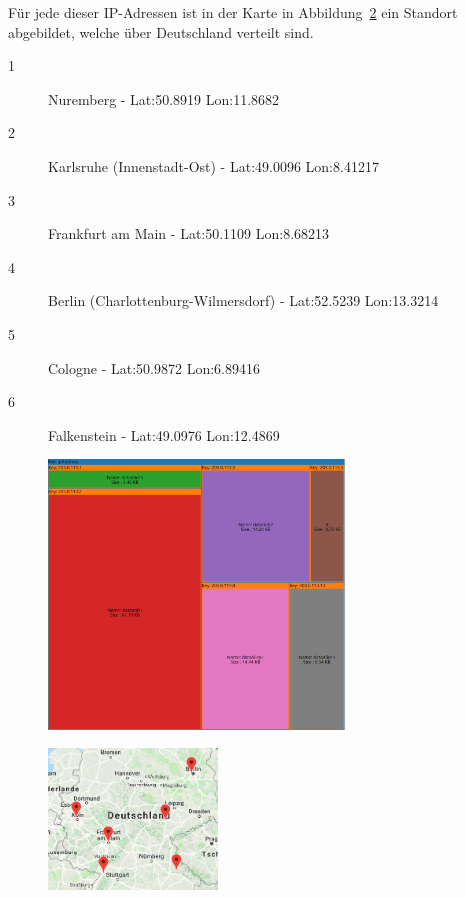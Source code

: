 \documentclass[
    fontsize=12pt,
    headings=small,
    parskip=half,           %
    bibliography=totoc,
    numbers=noenddot,       %
    open=any,               %
    ]{scrreprt}
\begin{document}
Für jede dieser IP-Adressen ist in der Karte in Abbildung~\ref{fig:TIpM} ein Standort abgebildet, welche über Deutschland verteilt sind. 
\begin{description}
\item[1] Nuremberg - Lat:50.8919 Lon:11.8682
\item[2] Karlsruhe (Innenstadt-Ost) - Lat:49.0096 Lon:8.41217
\item[3] Frankfurt am Main - Lat:50.1109 Lon:8.68213
\item[4] Berlin (Charlottenburg-Wilmersdorf) - Lat:52.5239 Lon:13.3214
\item[5] Cologne - Lat:50.9872 Lon:6.89416
\item[6] Falkenstein - Lat:49.0976 Lon:12.4869
\end{description}

\begin{figure}[H]
\includegraphics[width=0.7\textwidth]{../pic/IP-Tor-SetB-tree3.PNG}
\label{fig:TIpTM}
\end{figure}

\begin{figure}[H]
\includegraphics[width=0.4\textwidth]{../pic/IP-Tor-SetB.PNG}
\label{fig:TIpM}
\end{figure}
\end{document}
